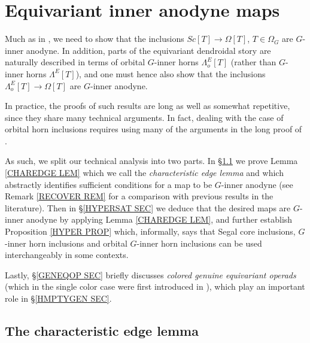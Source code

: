 \documentclass[a4paper,10pt
 ,draft
]{article}%
\begin{document}
\section{Equivariant inner anodyne maps}\label{EQINNERAN SEC}

Much as in \cite[\S 2]{CM13a}, 
we need to show that the inclusions $Sc[T] \to \Omega[T]$, $T\in \Omega_G$ are $G$-inner anodyne.
In addition, parts of the equivariant dendroidal story are 
naturally described in terms of 
orbital $G$-inner horns $\Lambda^E_o[T]$ 
(rather than $G$-inner horns $\Lambda^E[T]$),
and one must hence also show that the inclusions
$\Lambda^E_o[T] \to \Omega[T]$
are $G$-inner anodyne.

In practice, the proofs of such results are long as well as somewhat repetitive, since they share many technical arguments.
In fact, dealing with the case of orbital horn inclusions requires using many of the arguments in the long proof of \cite[Thm 7.1]{Per18}.

As such, we split our technical analysis into two parts.
In \S \ref{CHAREDGE SEC} we prove Lemma \ref{CHAREDGE LEM} which  we call the \textit{characteristic edge lemma} and
which abstractly identifies sufficient conditions for a map to be $G$-inner anodyne
(see Remark \ref{RECOVER REM} for a comparison with previous results in the literature).
Then in \S \ref{HYPERSAT SEC} we deduce that the desired maps
are $G$-inner anodyne by applying Lemma \ref{CHAREDGE LEM},
and further establish Proposition \ref{HYPER PROP} which,
informally,
says that Segal core inclusions, $G$-inner horn inclusions and orbital $G$-inner horn inclusions can be used interchangeably in some contexts.


Lastly, \S \ref{GENEQOP SEC} briefly discusses \textit{colored genuine equivariant operads}
(which in the single color case were first introduced in \cite{BP17}), which play an important role in \S \ref{HMPTYGEN SEC}.


\subsection{The characteristic edge lemma} \label{CHAREDGE SEC}
\end{document}
